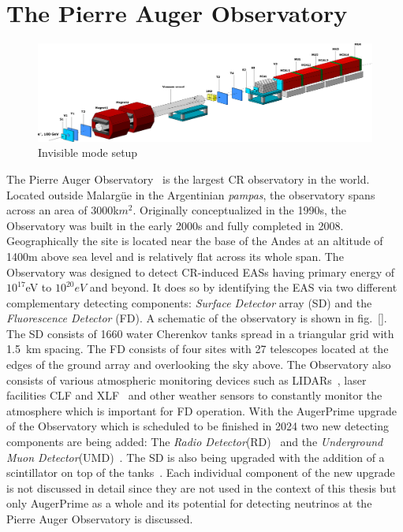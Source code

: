
\chapter{The Pierre Auger Observatory}
\label{chap:setup}
\begin{figure}[h!]
\centering
\includegraphics[width=\textwidth]{thesis_figures/Invisible_3d_setup.png}
\caption{Invisible mode setup~\cite{}}
\label{fig:Invisible_mode_setup}
\end{figure}

The Pierre Auger Observatory~\cite{Auger:2015} is the largest CR observatory in the world. Located outside Malargüe in the Argentinian \textit{pampas}, the observatory spans across an area of 3000k$m^2$. Originally conceptualized in the 1990s, the Observatory was built in the early 2000s and fully completed in 2008. Geographically the site is located near the base of the Andes at an altitude of 1400m above sea level and is relatively flat across its whole span. The Observatory was designed to detect CR-induced EASs having primary energy of $10^{17}$eV to $10^{20}eV$ and beyond. It does so by identifying the EAS via two different complementary detecting components: \textit{Surface Detector} array (SD) and the \textit{Fluorescence Detector} (FD). A schematic of the observatory is shown in fig.~\ref{}. The SD consists of 1660 water Cherenkov tanks spread in a triangular grid with 1.5 km spacing. The FD consists of four sites with 27 telescopes located at the edges of the ground array and overlooking the sky above. The Observatory also consists of various atmospheric monitoring devices such as LIDARs~\cite{BENZVI2007171}, laser facilities CLF and XLF~\cite{article_clf,Lawrence_Wiencke_2009} and other weather sensors to constantly monitor the atmosphere which is important for FD operation. With the AugerPrime upgrade of the Observatory which is scheduled to be finished in 2024 two new detecting components are being added: The \textit{Radio Detector}(RD)~\cite{Horandel:2023XL} and the \textit{Underground Muon Detector}(UMD)~\cite{AbdulHalim:2023ZF}. The SD is also being upgraded with the addition of a scintillator on top of the tanks~\cite{Cataldi:2021uwd}. Each individual component of the new upgrade is not discussed in detail since they are not used in the context of this thesis but only AugerPrime as a whole and its potential for detecting neutrinos at the Pierre Auger Observatory is discussed.

